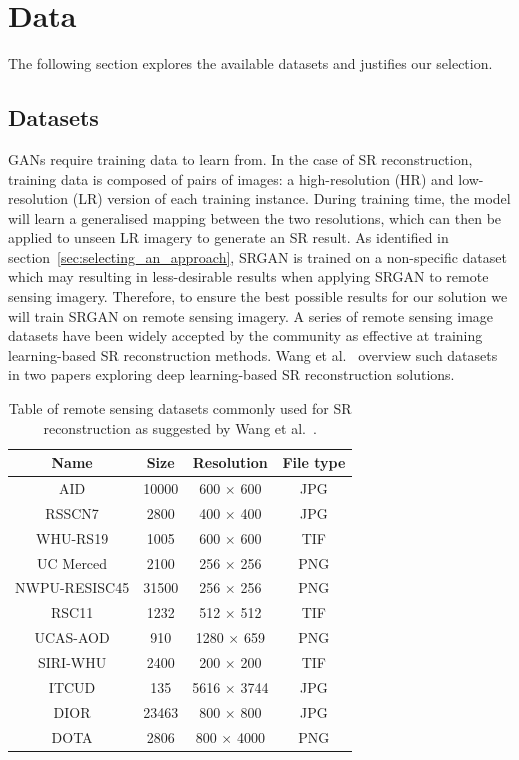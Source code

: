 \section{Data}
The following section explores the available datasets and justifies our selection.

\subsection{Datasets}
GANs require training data to learn from. In the case of SR reconstruction, training data is composed of pairs of images: a high-resolution (HR) and low-resolution (LR) version of each training instance. During training time, the model will learn a generalised mapping between the two resolutions, which can then be applied to unseen LR imagery to generate an SR result. As identified in section~\ref{sec:selecting_an_approach}, SRGAN is trained on a non-specific dataset which may resulting in less-desirable results when applying SRGAN to remote sensing imagery. Therefore, to ensure the best possible results for our solution we will train SRGAN on remote sensing imagery. A series of remote sensing image datasets have been widely accepted by the community as effective at training learning-based SR reconstruction methods. Wang et al.~\cite{remoteSensingDeepLearningReview, remoteSensingGANsReview} overview such datasets in two papers exploring deep learning-based SR reconstruction solutions.
\begin{table}
    \centering
    \begin{tabular}{cccc}
        \toprule
        \textbf{Name} & \textbf{Size} & \textbf{Resolution} & \textbf{File type} \\
        \midrule
        AID & 10000 & 600 $\times$ 600 & JPG \\
        RSSCN7 & 2800 & 400 $\times$ 400 & JPG \\
        WHU-RS19 & 1005 & 600 $\times$ 600 & TIF \\
        UC Merced & 2100 & 256 $\times$ 256 & PNG \\
        NWPU-RESISC45 & 31500 & 256 $\times$ 256 & PNG \\
        RSC11 & 1232 & 512 $\times$ 512 & TIF \\
        UCAS-AOD & 910 & 1280 $\times$ 659 & PNG \\
        SIRI-WHU & 2400 & 200 $\times$ 200 & TIF \\
        ITCUD & 135 & 5616 $\times$ 3744 & JPG \\
        DIOR & 23463 & 800 $\times$ 800 & JPG \\
        DOTA & 2806 & 800 $\times$ 4000 & PNG \\
        \bottomrule
    \end{tabular}
    \caption{Table of remote sensing datasets commonly used for SR reconstruction as suggested by Wang et al.~\cite{remoteSensingDeepLearningReview,remoteSensingGANsReview}.}
    \label{table:datasets_table}
\end{table}

